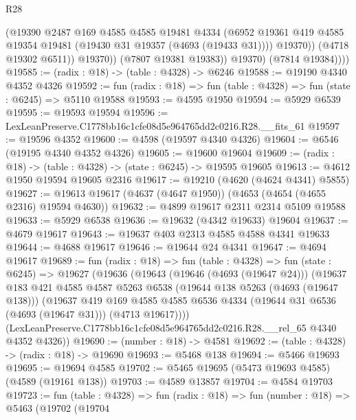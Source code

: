 \begin{lexlean}{R28}
\begin{coremodule}
                      (@19390
                        @2487
                        @169
                        @4585
                        @4585
                        @19481
                        @4334
                        (@6952
                          @19361
                          @419
                          @4585
                          @19354
                          @19481
                          (@19430 @31 @19357 (@4693 (@19433 @31))))
                        @19370))
                    (@4718 @19302 @6511))
                  @19370))
              (@7807 @19381 @19383))
            @19370)
          (@7814 @19384))))
@19585 := (radix : @18) -> (table : @4328) -> @6246
@19588 := @19190 @4340 @4352 @4326
@19592 := fun (radix : @18) => fun (table : @4328) => fun (state : @6245) => @5110 @19588
@19593 := @4595 @1950
@19594 := @5929 @6539
@19595 := @19593 @19594
@19596 := LexLeanPreserve.C1778bb16c1cfe08d5e964765dd2c0216.R28.__fits_61
@19597 := @19596 @4352
@19600 := @4598 (@19597 @4340 @4326)
@19604 := @6546 (@19195 @4340 @4352 @4326)
@19605 := @19600 @19604
@19609 := (radix : @18) -> (table : @4328) -> (state : @6245) -> @19595 @19605
@19613 := @4612 @1950 @19594 @19605 @2316
@19617 := @19210 (@4620 (@4624 @4341) @5855)
@19627 := @19613 @19617 (@4637 (@4647 @1950)) (@4653 (@4654 (@4655 @2316) @19594 @4630))
@19632 := @4899 @19617 @2311 @2314 @5109 @19588
@19633 := @5929 @6538
@19636 := @19632 (@4342 @19633) @19604
@19637 := @4679 @19617
@19643 := @19637 @403 @2313 @4585 @4588 @4341 @19633
@19644 := @4688 @19617
@19646 := @19644 @24 @4341
@19647 := @4694 @19617
@19689 := fun (radix : @18) =>
  fun (table : @4328) =>
  fun (state : @6245) =>
  @19627
    (@19636
      (@19643
        (@19646 (@4693 (@19647 @24)))
        (@19637
          @183
          @421
          @4585
          @4587
          @5263
          @6538
          (@19644 @138 @5263 (@4693 (@19647 @138)))
          (@19637
            @419
            @169
            @4585
            @4585
            @6536
            @4334
            (@19644 @31 @6536 (@4693 (@19647 @31)))
            (@4713 @19617))))
      (LexLeanPreserve.C1778bb16c1cfe08d5e964765dd2c0216.R28.__rel_65 @4340 @4352 @4326))
@19690 := (number : @18) -> @4581
@19692 := (table : @4328) -> (radix : @18) -> @19690
@19693 := @5468 @138
@19694 := @5466 @19693
@19695 := @19694 @4585
@19702 := @5465 @19695 (@5473 @19693 @4585) (@4589 (@19161 @138))
@19703 := @4589 @13857
@19704 := @4584 @19703
@19723 := fun (table : @4328) =>
  fun (radix : @18) =>
  fun (number : @18) =>
  @5463
    (@19702
      (@19704

\end{coremodule}
\end{lexlean}
